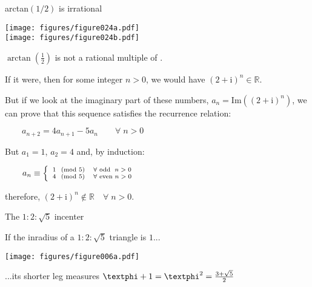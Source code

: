 \documentclass[14pt]{beamer}
\begin{document}

    \begin{frame}{arctan$(1/2)$ is irrational}
        \begin{center}
            \begin{minipage}{0.45\textwidth}%
                \texttt{[image: figures/figure024a.pdf]} \\[2ex]
                \texttt{[image: figures/figure024b.pdf]} \\
            \end{minipage}\hfill\begin{minipage}{0.5\textwidth}
                \footnotesize

                $\arctan(\tfrac{1}{2})$ is not a rational multiple of \textpi.\bigskip

                If it were, then for some integer $n>0$, we would have $(2\!+\!\text{i})^n \in \mathbb{R}$.\bigskip

                But if we look at the imaginary part of these numbers, $a_n = \text{Im}((2\!+\!\text{i})^n)$, we can prove that this sequence satisfies the recurrence relation:\bigskip

                $\qquad a_{n+2} = 4 a_{n+1} - 5 a_n\qquad \forall\; n > 0$\bigskip

                But $a_1 = 1$, $a_2 = 4$ and, by induction:\bigskip

                $\qquad a_n \equiv \left\{ {\scriptsize  \begin{array}{ll}
                                                        1\;\pmod{5} & \forall\text{ odd }\; n > 0\\
                                                        4\;\pmod{5} & \forall\text{ even } n > 0\\
                                                    \end{array}}\right. $\bigskip

                therefore, $(2\!+\!\text{i})^n \notin \mathbb{R} \quad \forall\; n > 0$.\bigskip
            \end{minipage}
        \end{center}
    \end{frame}


    \begin{frame}{The $1\!\!:\!\!2\!\!:\!\!\sqrt{5}$ incenter}
        \begin{center}
            If the inradius of a $1\!\!:\!\!2\!\!:\!\!\sqrt{5}$ triangle is $1$...

            \bigskip \bigskip

            \texttt{[image: figures/figure006a.pdf]}

            \bigskip \bigskip

            ...its shorter leg measures $\text{\textphi}+1 = \text{\textphi}^2 = \frac{3+\sqrt{5}}{2}$
        \end{center}
    \end{frame}
\end{document}

